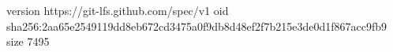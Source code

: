 version https://git-lfs.github.com/spec/v1
oid sha256:2aa65e2549119dd8eb672cd3475a0f9db8d48ef2f7b215e3de0d1f867acc9fb9
size 7495
